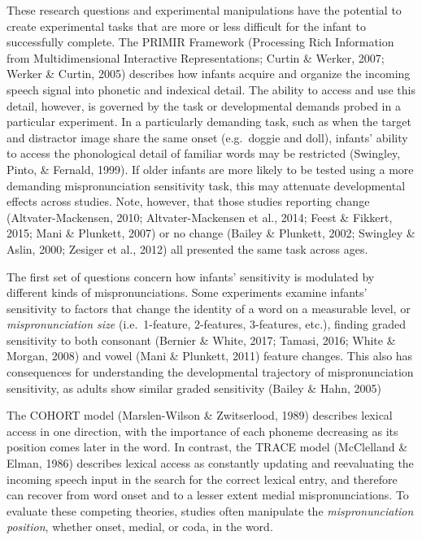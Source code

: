 \documentclass[man, noextraspace]{apa6}
\begin{document}
These research questions and experimental manipulations have the potential to create experimental tasks that are more or less difficult for the infant to successfully complete. The PRIMIR Framework (Processing Rich Information from Multidimensional Interactive Representations; Curtin \& Werker, 2007; Werker \& Curtin, 2005) describes how infants acquire and organize the incoming speech signal into phonetic and indexical detail. The ability to access and use this detail, however, is governed by the task or developmental demands probed in a particular experiment. In a particularly demanding task, such as when the target and distractor image share the same onset (e.g.~doggie and doll), infants' ability to access the phonological detail of familiar words may be restricted (Swingley, Pinto, \& Fernald, 1999). If older infants are more likely to be tested using a more demanding mispronunciation sensitivity task, this may attenuate developmental effects across studies. Note, however, that those studies reporting change (Altvater-Mackensen, 2010; Altvater-Mackensen et al., 2014; Feest \& Fikkert, 2015; Mani \& Plunkett, 2007) or no change (Bailey \& Plunkett, 2002; Swingley \& Aslin, 2000; Zesiger et al., 2012) all presented the same task across ages.

The first set of questions concern how infants' sensitivity is modulated by different kinds of mispronunciations. Some experiments examine infants' sensitivity to factors that change the identity of a word on a measurable level, or \emph{mispronunciation size} (i.e.~1-feature, 2-features, 3-features, etc.), finding graded sensitivity to both consonant (Bernier \& White, 2017; Tamasi, 2016; White \& Morgan, 2008) and vowel (Mani \& Plunkett, 2011) feature changes. This also has consequences for understanding the developmental trajectory of mispronunciation sensitivity, as adults show similar graded sensitivity (Bailey \& Hahn, 2005)

The COHORT model (Marslen-Wilson \& Zwitserlood, 1989) describes lexical access in one direction, with the importance of each phoneme decreasing as its position comes later in the word. In contrast, the TRACE model (McClelland \& Elman, 1986) describes lexical access as constantly updating and reevaluating the incoming speech input in the search for the correct lexical entry, and therefore can recover from word onset and to a lesser extent medial mispronunciations. To evaluate these competing theories, studies often manipulate the \emph{mispronunciation position}, whether onset, medial, or coda, in the word.
\end{document}
